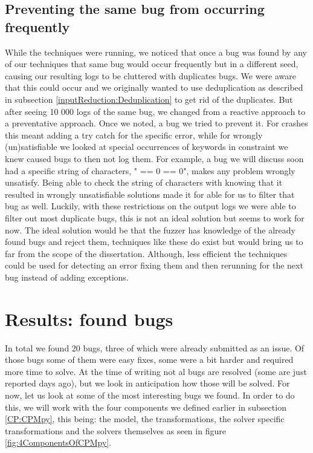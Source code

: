 \subsection{Preventing the same bug from occurring frequently}
While the techniques were running, we noticed that once a bug was found by any of our techniques that same bug would occur frequently but in a different seed, causing our resulting logs to be cluttered with duplicates bugs. We were aware that this could occur and we originally wanted to use deduplication as described in subsection \ref{inputReduction:Deduplication} to get rid of the duplicates. But after seeing 10 000 logs of the same bug, we changed from a reactive approach to a preventative approach. Once we noted, a bug we tried to prevent it. For crashes this meant adding a try catch for the specific error, while for wrongly (un)satisfiable we looked at special occurrences of keywords in constraint we knew caused bugs to then not log them. For example, a bug we will discuss soon had a specific string of characters, " == 0 == 0", makes any problem wrongly unsatisfy. Being able to check the string of characters with knowing that it resulted in wrongly unsatisfiable  solutions made it for able for us to filter that bug as well. Luckily, with these restrictions on the output logs we were able to filter out most duplicate bugs, this is not an ideal solution but seems to work for now. The ideal solution would be that the fuzzer has knowledge of the already found bugs and reject them, techniques like these do exist but would bring us to far from the scope of the dissertation. Although, less efficient the techniques could be used for detecting an error fixing them and then rerunning for the next bug instead of adding exceptions.

\section{Results: found bugs}
\label{res:bugs}
In total we found 20 bugs, three of which were already submitted as an issue. Of those bugs some of them were easy fixes, some were a bit harder and required more time to solve. At the time of writing not al bugs are resolved (some are just reported days ago), but we look in anticipation how those will be solved. For now, let us look at some of the most interesting bugs we found. In order to do this, we will work with the four components we defined earlier in subsection \ref{CP:CPMpy}, this being: the model, the transformations, the solver specific transformations and the solvers themselves as seen in figure \ref{fig:4ComponentsOfCPMpy}.


